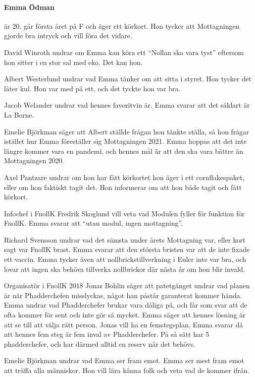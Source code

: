 \documentclass[hidelinks]{sektionsmote} %
\begin{document}
\paragraph{Emma Ödman} är 20, går första året på F och äger ett körkort.
Hon tycker att Mottagningen gjorde bra intryck och vill föra det vidare.\par
David Winroth undrar om Emma kan köra ett \enquote{Nollan ska vara tyst} eftersom hon sitter i en stor sal med eko.
Det kan hon.\par
Albert Westerlund undrar vad Emma tänker om att sitta i styret.
Hon tycker det låter kul.
Hon var med på ett, och det tyckte hon var bra.\par
Jacob Welander undrar vad hennes favoritvin är.
Emma svarar att det såklart är La Borne.\par
Emelie Björkman säger att Albert ställde frågan hon tänkte ställa, så hon frågar istället hur Emma föreställer sig Mottagningen 2021.
Emma hoppas att det inte längre kommer vara en pandemi, och hennes mål är att den ska vara bättre än Mottagningen 2020.\par
Axel Pantzare undrar om hon har fått körkortet hon äger i ett cornflakespaket, eller om hon faktiskt tagit det.
Hon informerar om att hon både tagit och fått körkort.\par
Infochef i FnollK Fredrik Skoglund vill veta vad Modulen fyller för funktion för FnollK.
Emma svarar att \enquote{utan modul, ingen mottagning}.\par
Richard Svensson undrar vad det sämsta under årets Mottagning var, eller kort sagt var FnollK brast.
Emma svarar att den största bristen var att de inte fixade ett vaccin.
Emma tycker även att nollbrickstillverkning i Euler inte var bra, och lovar att ingen ska behöva tillverka nollbrickor där nästa år om hon blir invald.\par
Organisatör i FnollK 2018 Jonas Bohlin säger att patetgänget undrar vad planen är när Phadderchefen misslyckas, något han påstår garanterat kommer hända.
Emma undrar vad Phadderchefer brukar vara dåliga på, och får som svar att de ofta kommer för sent och inte gör så mycket.
Emma säger att hennes lösning är att se till att välja rätt person.
Jonas vill ha en femstegsplan.
Emma svarar då att hennes fem steg är fem inval av Phadderchefer.
På så sätt har 5 phadderchefer, och har därmed alltid en reserv när det behövs.\par
Emelie Björkman undrar vad Emma ser fram emot.
Emma ser mest fram emot att träffa alla människor.
Hon vill lära känna folk och veta vad de kommer ifrån.\par
\end{document}
